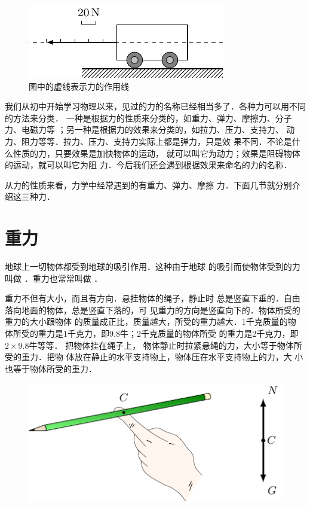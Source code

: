 \begin{figure}[htbp]
    \centering
    \includegraphics{fig/A/1-1.pdf} 
    \caption{图中的虚线表示力的作用线} \label{fig_A_1-1} 
\end{figure} 

我们从初中开始学习物理以来，见过的力的名称已经相当多了．各种力可以用不同的方法来分类．
一种是根据力的性质来分类的，如重力、弹力、摩擦力、分子力、电磁力等
；另一种是根据力的效果来分类的，如拉力、压力、支持力、
动力、阻力等等．拉力、压力、支持力实际上都是弹力，只是效
果不同．不论是什么性质的力，只要效果是加快物体的运动，
就可以叫它为动力；效果是阻碍物体的运动，就可以叫它为阻
力．今后我们还会遇到根据效果来命名的力的名称．

    从力的性质来看，力学中经常遇到的有重力、弹力、摩擦
力．下面几节就分别介绍这三种力．


\section{重力} 
    地球上一切物体都受到地球的吸引作用．这种由于地球
的吸引而使物体受到的力叫做 ．重力也常常叫做 ．

    重力不但有大小，而且有方向．悬挂物体的绳子，静止时
总是竖直下垂的．自由落向地面的物体，总是竖直下落的，可
见重力的方向是竖直向下的．物体所受的重力的大小跟物体
的质量成正比，质量越大，所受的重力越大．1千克质量的物
体所受的重力是1千克力，即9.8牛；2千克质量的物体所受
的重力是2千克力，即$2\times 9.8$牛等等．
把物体挂在绳子上，
物体静止时拉紧悬绳的力，大小等于物体所受的重力．把物
体放在静止的水平支持物上，物体压在水平支持物上的力，大
小也等于物体所受的重力．

\begin{figure}[htbp]
    \centering
    \includegraphics{fig/A/1-2.pdf} 
    \caption{} \label{fig_A_1-2} 
\end{figure} 

